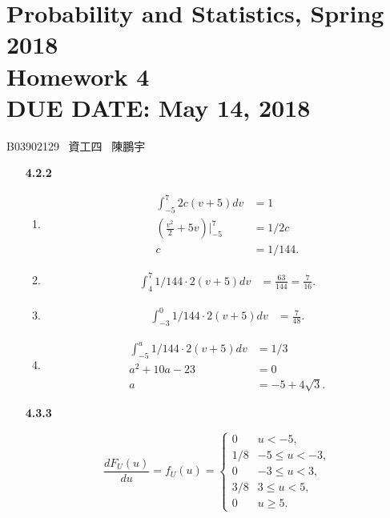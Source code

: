 \documentclass{article}
\newcommand{\hmwkClass}{Probability and Statistics, Spring 2018}
\newcommand{\hmwkTitle}{Homework 4}
\newcommand{\hmwkDueDate}{May 14, 2018}
\begin{document}
\thispagestyle{empty}
\section*{\hmwkClass \\
    \normalsize{\hmwkTitle} \\
    \normalsize{DUE DATE: \hmwkDueDate}
}

\hfill{B03902129 \, 資工四 \, 陳鵬宇}

\begin{enumerate}
    \item [\textbf{4.2.2}]

    \begin{enumerate}[label=(\alph*)]
        \item 
            \begin{align*}
                \int_{-5}^7 2c(v + 5) dv & = 1 \\
                (\frac{v^2}{2} + 5v) \Big|_{-5}^7 & = 1 / 2c \\
                c & = 1 / 144.
            \end{align*}

        \item
            \begin{align*}
                \int_4^7 1 / 144 \cdot 2(v + 5) dv & = \frac{63}{144} = \frac{7}{16}.
            \end{align*}

        \item
            \begin{align*}
                \int_{-3}^0 1 / 144 \cdot 2(v + 5) dv & = \frac{7}{48}.
            \end{align*}
        \item
            \begin{align*}
                \int_{-5}^a 1 / 144 \cdot 2(v + 5) dv & = 1 / 3 \\
                a^2 + 10a - 23 & = 0 \\
                a & = -5 + 4\sqrt{3}.
            \end{align*}

    \end{enumerate}

    \item [\textbf{4.3.3}]

    $$
    \frac{d F_U(u)}{du} = f_U(u) =
    \begin{cases}
        0     & u < -5, \\
        1 / 8 & -5 \le u < -3, \\
        0     & -3 \le u < 3, \\
        3 / 8 & 3 \le u < 5, \\
        0     & u \ge 5.
    \end{cases}
    $$


\end{enumerate}
\end{document}
